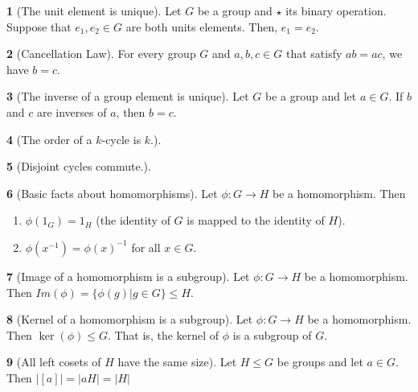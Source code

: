 \documentclass[12pt]{article}
\theoremstyle{definition}
\newtheorem{theorem}{\color{ForestGreen}{\textbf{Theorem}}}
\begin{document}
\begin{theorem}[The unit element is unique]
Let $G$ be a group and $\star$ its binary operation. Suppose that $e_1, e_2 \in G$ are both units elements. Then, $e_1 = e_2$.
\end{theorem}

\begin{theorem}[Cancellation Law]
For every group $G$ and $a,b,c \in G$ that satisfy $ab = ac$, we have $b=c$.
\end{theorem}

\begin{theorem}[The inverse of a group element is unique]
Let $G$ be a group and let $a \in G$. If $b$ and $c$ are inverses of $a$, then $b = c$.
\end{theorem}

\begin{theorem}[The order of a $k$-cycle is $k$.]
\end{theorem}

\begin{theorem}[Disjoint cycles commute.]
\end{theorem}

\begin{theorem}[Basic facts about homomorphisms]
Let $\phi : G \to H$ be a homomorphism. Then
\begin{enumerate}
\item $\phi(1_G) = 1_H$ (the identity of $G$ is mapped to the identity of $H$).
\item $\phi(x^{-1}) = \phi(x)^{-1}$ for all $x \in G$.
\end{enumerate}
\end{theorem}

\begin{theorem}[Image of a homomorphism is a subgroup]
Let $\phi : G \to H$ be a homomorphism. Then $Im(\phi) = \{ \phi(g) | g \in G \} \leq H$.
\end{theorem}

\begin{theorem}[Kernel of a homomorphism is a subgroup]
Let $\phi: G \to H$ be a homomorphism. Then $\ker(\phi) \leq G$. That is, the kernel of $\phi$ is a subgroup of $G$.
\end{theorem}

\begin{theorem}[All left cosets of $H$ have the same size]
Let $H \leq G$ be groups and let $a \in G$. Then $|[a] | = |aH| = |H|$
\end{theorem}
\end{document}
